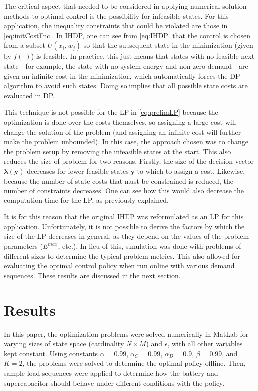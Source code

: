 \documentclass[conference]{IEEEtran}
\begin{document}
The critical aspect that needed to be considered in applying numerical solution methods to optimal control is the possibility for infeasible states. For this application, the inequality constraints that could be violated are those in \eqref{eq:initCostFnc}. In IHDP, one can see from \eqref{eq:IHDP} that the control is chosen from a subset $U(x_{i},w_{j})$ so that the subsequent state in the minimization (given by $f(\cdot)$) is feasible. In practice, this just means that states with no feasible next state - for example, the state with no system energy and non-zero demand - are given an infinite cost in the minimization, which automatically forces the DP algorithm to avoid such states. Doing so implies that all possible state costs are evaluated in DP.

This technique is not possible for the LP in \eqref{eq:prelimLP} because the optimization is done over the costs themselves, so assigning a large cost will change the solution of the problem (and assigning an infinite cost will further make the problem unbounded). In this case, the approach chosen was to change the problem setup by removing the infeasible states at the start. This also reduces the size of problem for two reasons. Firstly, the size of the decision vector $\boldsymbol{\lambda(y)}$ decreases for fewer feasible states $\boldsymbol{y}$ to which to assign a cost. Likewise, because the number of state costs that must be constrained is reduced, the number of constraints decreases. One can see how this would also decrease the computation time for the LP, as previously explained.

It is for this reason that the original IHDP was reformulated as an LP for this application. Unfortunately, it is not possible to derive the factors by which the size of the LP decreases in general, as they depend on the values of the problem parameters ($E^{max}$, etc.). In lieu of this, simulation was done with problems of different sizes to determine the typical problem metrics. This also allowed for evaluating the optimal control policy when run online with various demand sequences. These results are discussed in the next section.


\section{Results}
In this paper, the optimization problems were solved numerically in MatLab for varying sizes of state space (cardinality $N \times M$) and $\epsilon$, with all other variables kept constant. Using constants $\alpha=0.99$, $\alpha_{C}=0.99$, $\alpha_{D}=0.9$, $\beta=0.99$, and $K=2$, the problems were solved to determine the optimal policy offline. Then, sample load sequences were applied to determine how the battery and supercapacitor should behave under different conditions with the policy. %
\end{document}
